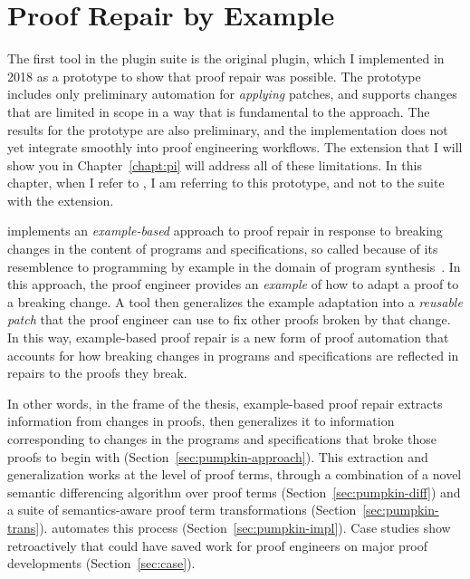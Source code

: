 \chapter{Proof Repair by Example}
\label{ch:example}

The first tool in the \sysname plugin suite is the original \sysname plugin, which I implemented in 2018 as a prototype to show that proof repair was possible.
The \sysname prototype includes only preliminary automation for \textit{applying} patches,
and supports changes that are limited in scope in a way that is fundamental to the approach.
The results for the \sysname prototype are also preliminary, and the implementation does not yet integrate smoothly into proof engineering workflows.
The \toolnamec extension that I will show you in Chapter~\ref{chapt:pi} will address all of these limitations.
In this chapter, when I refer to \sysname, I am referring to this prototype, and not to the suite with the \toolnamec extension.

\sysname implements an \textit{example-based} approach to proof repair in response to breaking changes in the content of programs and specifications,
so called because of its resemblence to programming by example in the domain of program synthesis~\cite{DBLP:journals/ftpl/GulwaniPS17}.
In this approach, the proof engineer provides an \textit{example} of how to adapt a proof to a breaking change.
A tool then generalizes the example adaptation into a \textit{reusable patch} that the proof engineer can use to fix other proofs broken by that change.
In this way, example-based proof repair is a new form of proof automation that accounts for how breaking changes in programs and specifications
are reflected in repairs to the proofs they break.

In other words, in the frame of the thesis, example-based proof repair extracts information from changes in proofs,
then generalizes it to information corresponding to changes in the programs and specifications that broke those proofs to begin with (Section~\ref{sec:pumpkin-approach}).
This extraction and generalization works at the level of proof terms, through a combination of a novel semantic differencing algorithm over proof terms (Section~\ref{sec:pumpkin-diff}) and 
a suite of semantics-aware proof term transformations (Section~\ref{sec:pumpkin-trans}).
\sysname automates this process (Section~\ref{sec:pumpkin-impl}).
Case studies show retroactively that \sysname could have saved work for proof engineers
on major proof developments (Section~\ref{sec:case}).















